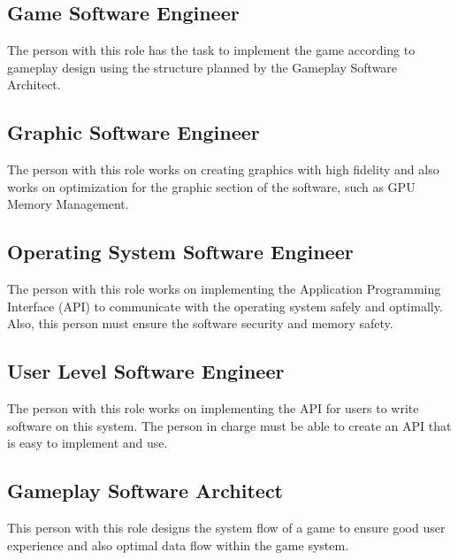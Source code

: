 \subsection*{Game Software Engineer}
The person with this role has the task to implement the game according to gameplay design
using the structure planned by the Gameplay Software Architect.

\subsection*{Graphic Software Engineer}
The person with this role works on creating graphics with high fidelity and also works
on optimization for the graphic section of the software, such as GPU Memory Management.

\subsection*{Operating System Software Engineer}
The person with this role works on implementing the Application Programming Interface (API) to communicate with
the operating system safely and optimally.
Also, this person must ensure the software security and memory safety.

\subsection*{User Level Software Engineer}
The person with this role works on implementing the API for users to write software on this system.
The person in charge must be able to create an API that is easy to implement and use.

\subsection*{Gameplay Software Architect}
This person with this role designs the system flow of a game to ensure good user experience
and also optimal data flow within the game system.

